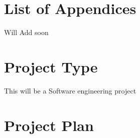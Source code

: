 \section{List of Appendices}
Will Add soon

\section{Project Type}
This will be a Software engineering project
\section{Project Plan}
\noindent
{}
{}
